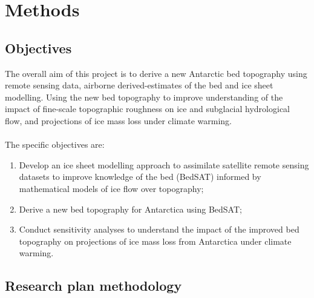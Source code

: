 \chapter{Methods}
\section*{Objectives}

The overall aim of this project is to derive a new Antarctic bed topography using remote sensing data, airborne derived-estimates of the bed and ice sheet modelling. Using the new bed topography to improve understanding of the impact of fine-scale topographic roughness on ice and subglacial hydrological flow, and projections of ice mass loss under climate warming.\\
\\The specific objectives are:
\begin{enumerate}
    \item Develop an ice sheet modelling approach to assimilate satellite remote sensing datasets to improve knowledge of the bed (BedSAT) informed by mathematical models of ice flow over topography;
    \item Derive a new bed topography for Antarctica using BedSAT;
    \item Conduct sensitivity analyses to understand the impact of the improved bed topography on projections of ice mass loss from Antarctica under climate warming.
\end{enumerate}

\section*{Research plan methodology}





